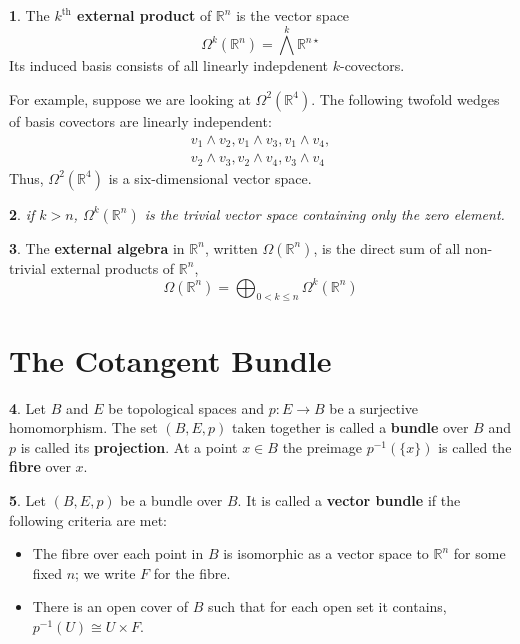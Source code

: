 \documentclass[oneside,english]{amsbook}
\numberwithin{section}{chapter}
\theoremstyle{plain}
\newtheorem{thm}{\protect\theoremname}
\theoremstyle{definition}
\newtheorem{defn}[thm]{\protect\definitionname}
\providecommand{\definitionname}{Definition}
\providecommand{\theoremname}{Theorem}
\begin{document}
			\begin{defn}
				The \textbf{$k^{\text{th}}$ external product} of $\mathbb{R}^{n}$ is the vector space
					\[
						\Omega^k(\mathbb{R}^{n}) = \bigwedge^k \mathbb{R}^{n\star}
					\] 
				Its induced basis consists of all linearly indepdenent $k$-covectors.
			\end{defn}
			
			For example, suppose we are looking at $\Omega^2(\mathbb{R}^{4})$. The following twofold wedges of basis covectors are linearly independent:
				\begin{align}[c]
					v_1\wedge v_2, v_1\wedge v_3, v_1\wedge v_4, \\
					v_2\wedge v_3, v_2\wedge v_4, v_3\wedge v_4
				\end{align}
			Thus, $\Omega^2(\mathbb{R}^{4})$ is a six-dimensional vector space.
			
			\begin{thm}
				if $k > n$, $\Omega^k(\mathbb{R}^{n})$ is the trivial vector space containing only the zero element.
			\end{thm}
			
			\begin{defn}
				The \textbf{external algebra} in $\mathbb{R}^n$, written $\Omega(\mathbb{R}^n)$, is the direct sum of all non-trivial external products of $\mathbb{R}^n$,
				\[
					\Omega(\mathbb{R}^n) = \bigoplus_{0<k\le n}\Omega^k(\mathbb{R}^n)
				\]
			\end{defn}
			
		\section{The Cotangent Bundle}
		
			\begin{defn}
				Let $B$ and $E$ be topological spaces and $p:E\to B$ be a surjective homomorphism. The set $(B, E, p)$ taken together is called a \textbf{bundle} over $B$ and $p$ is called its \textbf{projection}. At a point $x\in B$ the preimage $p^{-1}(\{x\})$ is called the \textbf{fibre} over $x$.
			\end{defn}			
			
			\begin{defn}
				Let $(B, E, p)$ be a bundle over $B$. It is called a \textbf{vector bundle} if the following criteria are met:
				\begin{itemize}
					\item The fibre over each point in $B$ is isomorphic as a vector space to $\mathbb{R}^n$ for some fixed $n$; we write $F$ for the fibre.
					\item There is an open cover of $B$ such that for each open set it contains, $p^{-1}(U)\cong U\times F$.
				\end{itemize}
			\end{defn}
			
\end{document}
